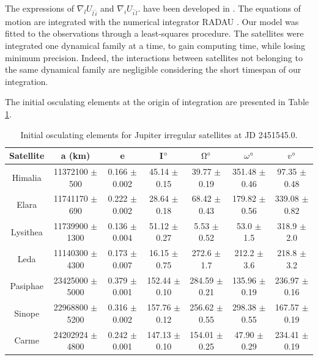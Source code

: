 \documentclass[useAMS,usenatbib]{mn2e}
\begin{document}
The expressions of $\nabla_lU_{\bar{l}\, \hat{i}}$ and $\nabla_i U_{\bar{i}\, \hat{l}}.$ have been developed in \citet{Lainey2004}. The equations of motion are integrated with the numerical integrator RADAU \citep{Everhart1985}. 
Our model was fitted to the observations through a least-squares procedure. The satellites were integrated one dynamical family at a time, to gain computing time, while losing minimum precision. Indeed, the interactions between satellites not belonging to the same dynamical family are negligible considering the short timespan of our integration. 

The initial osculating elements at the origin of integration are presented in Table \ref{Tab: sat_ell}.

\begin{table}
\caption{Initial osculating elements for Jupiter irregular satellites at JD 2451545.0.
 }\label{Tab: sat_ell}
\begin{center}
\begin{tabular}{ccccccc}
\hline\hline
Satellite & a (km) & e & I$\hbox{$^\circ$}$ & $\Omega\hbox{$^\circ$}$ & $\omega\hbox{$^\circ$}$ & $v\hbox{$^\circ$}$ \\ 
\hline
Himalia &   11372100 $\pm$ 500    &    0.166 $\pm$ 0.002      &   45.14 $\pm$ 0.15      &   39.77 $\pm$ 0.19      &   351.48 $\pm$ 0.46      &   97.35 $\pm$ 0.48    \\
Elara &   11741170 $\pm$ 690  &      0.222 $\pm$ 0.002      &   28.64 $\pm$ 0.18      &   68.42 $\pm$ 0.43      &   179.82 $\pm$ 0.56      &   339.08 $\pm$ 0.82  \\
Lysithea &   11739900 $\pm$ 1300  &      0.136 $\pm$ 0.004      &    51.12 $\pm$ 0.27     &   5.53 $\pm$ 0.52      &   53.0 $\pm$ 1.5      &   318.9 $\pm$ 2.0   \\
Leda &   11140300  $\pm$ 4300  &     0.173  $\pm$ 0.007     &   16.15  $\pm$ 0.75    &   272.6  $\pm$ 1.7    &   212.2  $\pm$ 3.6          &   218.8  $\pm$ 3.2  \\
Pasiphae &  23425000  $\pm$ 5000    &     0.379  $\pm$ 0.001       &   152.44 $\pm$ 0.10      &   284.59 $\pm$ 0.21      &   135.96 $\pm$ 0.19      &   236.97 $\pm$ 0.16 \\
Sinope &   22968800 $\pm$ 5200   &     0.316 $\pm$ 0.002      &   157.76 $\pm$ 0.12      &   256.62 $\pm$ 0.55      &   298.38 $\pm$ 0.55      &   167.57 $\pm$ 0.19    \\
Carme &   24202924 $\pm$ 4800      &  0.242 $\pm$ 0.001      &   147.13 $\pm$ 0.10      &   154.01 $\pm$ 0.25      &   47.90 $\pm$ 0.29      &   234.41 $\pm$ 0.19  \\

\end{tabular}
\end{center}
\end{table}
\end{document}
